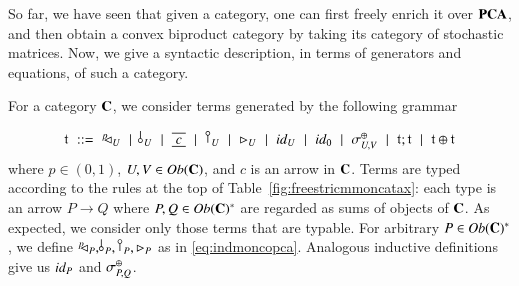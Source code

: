 

So far, we have seen that given a category, one can first freely enrich it over $\mathbf{PCA}$, and then obtain a convex biproduct category by taking its category of stochastic matrices.
Now, we give a syntactic description, in terms of generators and equations, of such a category.


For a category $\mathbf{C}$, we consider terms generated by the following grammar
  
\begin{equation}\label{tapesGrammar}
\setlength{\arraycolsep}{3pt}
\begin{array}{rcccccccccccccccccccc}
\t & ::= & \diagp{U} & \mid & \bangp{U} & \mid & \tapeFunct{c} & \mid & \cobang{U} & \mid & 
\codiag{U} & \mid & \id{U} & \mid & \id{\zero} & \mid & \sigma_{U,V}^{\piu} & \mid & \t ; \t & \mid & \t \piu \t
\end{array}
\end{equation}
%
%
where $p\in (0,1)$, $U,V \in Ob(\mathbf{C})$, and $c$ is an arrow in $\mathbf{C}$. Terms are typed according to the rules at the top of Table~\ref{fig:freestricmmoncatax}: each type is an arrow $P \to Q$ where $P,Q\in Ob(\mathbf{C})^*$ are regarded as sums of objects of $\mathbf{C}$. As expected, we consider only those terms that are typable. For arbitrary $P \in Ob(\mathbf{C})^*$, we define
$\diagp{P},\bangp{P},\cobang{P},\codiag{P}$ as in \eqref{eq:indmoncopca}. Analogous inductive definitions give us ${id}_{P}$ and $\symmp{P}{Q}$. %


